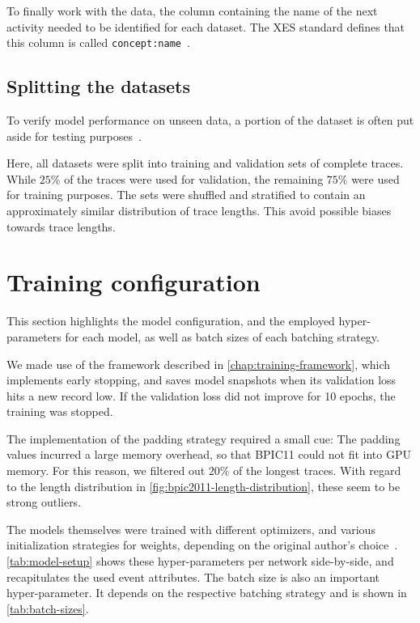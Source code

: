 To finally work with the data, the column containing the name of the next activity needed to be identified for each dataset. The XES standard defines that this column is called \verb=concept:name=~\cite{Aalst2016}.

\subsection*{Splitting the datasets}
To verify model performance on unseen data, a portion of the dataset is often put aside for testing purposes~\cite{kuhn2013applied}.

Here, all datasets were split into training and validation sets of complete traces. While $25\%$ of the traces were used for validation, the remaining $75\%$ were used for training purposes. The sets were shuffled and stratified to contain an approximately similar distribution of trace lengths. This avoid possible biases towards trace lengths.

\section{Training configuration}\label{sec:eval:test-setup}
This section highlights the model configuration, and the employed hyper-parameters for each model, as well as batch sizes of each batching strategy.

We made use of the framework described in \autoref{chap:training-framework}, which implements early stopping, and saves model snapshots when its validation loss hits a new record low. If the validation loss did not improve for 10 epochs, the training was stopped.

The implementation of the padding strategy required a small cue: The padding values incurred a large memory overhead, so that BPIC11 could not fit into GPU memory. For this reason, we filtered out $20\%$ of the longest traces. With regard to the length distribution in \autoref{fig:bpic2011-length-distribution}, these seem to be strong outliers.

The models themselves were trained with different optimizers, and various initialization strategies for weights, depending on the original author's choice~\cite{evermann2016, schoenig2018}. \autoref{tab:model-setup} shows these hyper-parameters per network side-by-side, and recapitulates the used event attributes. The batch size is also an important hyper-parameter. It depends on the respective batching strategy and is shown in \autoref{tab:batch-sizes}.

